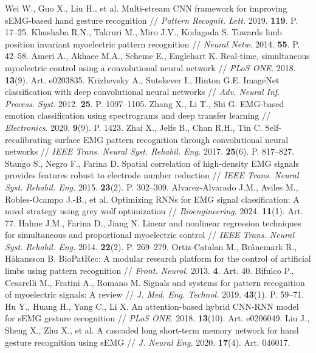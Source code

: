 \documentclass[12pt,a4paper]{article}
\begin{document}
\begin{thebibliography}{99}
 Wei W., Guo X., Liu H., et al. Multi-stream CNN framework for improving sEMG-based hand gesture recognition // \textit{Pattern Recognit. Lett.} 2019. \textbf{119}. P. 17–25.
 Khushaba R.N., Takruri M., Miro J.V., Kodagoda S. Towards limb position invariant myoelectric pattern recognition // \textit{Neural Netw.} 2014. \textbf{55}. P. 42–58.
 Ameri A., Akhaee M.A., Scheme E., Englehart K. Real-time, simultaneous myoelectric control using a convolutional neural network // \textit{PLoS ONE}. 2018. \textbf{13}(9). Art. e0203835.
 Krizhevsky A., Sutskever I., Hinton G.E. ImageNet classification with deep convolutional neural networks // \textit{Adv. Neural Inf. Process. Syst.} 2012. \textbf{25}. P. 1097–1105.
 Zhang X., Li T., Shi G. EMG-based emotion classification using spectrograms and deep transfer learning // \textit{Electronics}. 2020. \textbf{9}(9). P. 1423.
 Zhai X., Jelfs B., Chan R.H., Tin C. Self-recalibrating surface EMG pattern recognition through convolutional neural networks // \textit{IEEE Trans. Neural Syst. Rehabil. Eng.} 2017. \textbf{25}(6). P. 817–827.
 Stango S., Negro F., Farina D. Spatial correlation of high-density EMG signals provides features robust to electrode number reduction // \textit{IEEE Trans. Neural Syst. Rehabil. Eng.} 2015. \textbf{23}(2). P. 302–309.
 Alvarez-Alvarado J.M., Aviles M., Robles-Ocampo J.-B., et al. Optimizing RNNs for EMG signal classification: A novel strategy using grey wolf optimization // \textit{Bioengineering}. 2024. \textbf{11}(1). Art. 77.
 Hahne J.M., Farina D., Jiang N. Linear and nonlinear regression techniques for simultaneous and proportional myoelectric control // \textit{IEEE Trans. Neural Syst. Rehabil. Eng.} 2014. \textbf{22}(2). P. 269–279.
 Ortiz-Catalan M., Brånemark R., Håkansson B. BioPatRec: A modular research platform for the control of artificial limbs using pattern recognition // \textit{Front. Neurol.} 2013. \textbf{4}. Art. 40.
 Bifulco P., Cesarelli M., Fratini A., Romano M. Signals and systems for pattern recognition of myoelectric signals: A review // \textit{J. Med. Eng. Technol.} 2019. \textbf{43}(1). P. 59–71.
 Hu Y., Huang H., Yang C., Li X. An attention-based hybrid CNN-RNN model for sEMG gesture recognition // \textit{PLoS ONE}. 2018. \textbf{13}(10). Art. e0206049.
 Liu J., Sheng X., Zhu X., et al. A cascaded long short-term memory network for hand gesture recognition using sEMG // \textit{J. Neural Eng.} 2020. \textbf{17}(4). Art. 046017.

\end{thebibliography}
\end{document}
